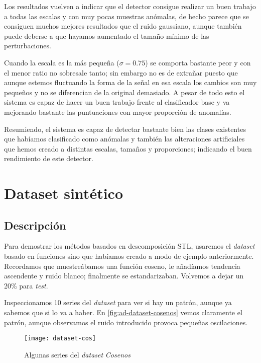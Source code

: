 Los resultados vuelven a indicar que el detector consigue realizar un buen trabajo a todas las escalas y con muy pocas muestras anómalas, de hecho parece que se consiguen muchos mejores resultados que el ruido gaussiano, aunque también puede deberse a que hayamos aumentado el tamaño mínimo de las perturbaciones.

Cuando la escala es la más pequeña ($\sigma = 0.75$) se comporta bastante peor y con el menor ratio no sobresale tanto; sin embargo no es de extrañar puesto que aunque estemos fluctuando la forma de la señal en esa escala los cambios son muy pequeños y no se diferencian de la original demasiado. A pesar de todo esto el sistema es capaz de hacer un buen trabajo frente al clasificador base y va mejorando bastante las puntuaciones con mayor proporción de anomalías.

Resumiendo, el sistema es capaz de detectar bastante bien las clases existentes que habíamos clasificado como anómalas y también las alteraciones artificiales que hemos creado a distintas escalas, tamaños y proporciones; indicando el buen rendimiento de este detector.

\section{Dataset sintético}

\subsection{Descripción}

Para demostrar los métodos basados en descomposición STL, usaremos el \emph{dataset} basado en funciones sino que habíamos creado a modo de ejemplo anteriormente. Recordamos que muestreábamos una función coseno, le añadíamos tendencia ascendente y ruido blanco; finalmente se estandarizaban. Volvemos a dejar un 20\% para \emph{test}.

Inspeccionamos 10 series del \emph{dataset}  para ver si hay un patrón, aunque ya sabemos que si lo va a haber. En \autoref{fig:ad-dataset-cosenos} vemos claramente el patrón, aunque observamos el ruido introducido provoca pequeñas oscilaciones.

\begin{figure}[htpb]
  \centering
  \texttt{[image: dataset-cos]}
  \caption{Algunas series del \emph{dataset} \emph{Cosenos}}
  \label{fig:ad-dataset-cosenos}
\end{figure}

